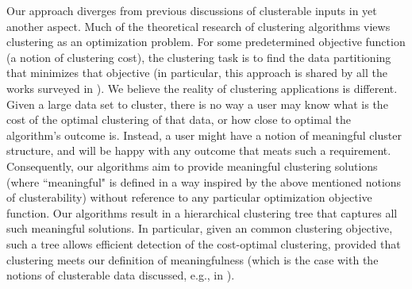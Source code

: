 \documentclass[anon,12pt]{colt2016} %
\begin{document}
Our approach diverges from previous discussions of clusterable inputs in yet another aspect. Much of the theoretical research of clustering algorithms views clustering as an optimization problem. For some predetermined objective function (a notion of clustering cost), the clustering task is to find the data partitioning that minimizes that objective  (in particular, this approach is shared by all the works surveyed in \cite{ashtiani2015representation}). We believe the reality of clustering applications is different. Given a large data set to cluster, there is no way a user may know what is the cost of the optimal clustering of that data, or how close to optimal the algorithm's outcome is. Instead, a user might have a notion of meaningful cluster structure, and will be happy with any outcome that meats such a requirement. Consequently, our algorithms aim to provide meaningful clustering solutions (where ``meaningful" is defined in a way inspired by the above mentioned notions of clusterability) without reference to any particular optimization objective function. Our algorithms result in a hierarchical clustering tree that captures all such meaningful solutions. In particular, given an common clustering objective, such a tree allows efficient detection of the cost-optimal clustering, provided that clustering meets our definition of meaningfulness (which is the case with the notions of clusterable data discussed, e.g., in \cite{balcan2012clustering}).
\end{document}

